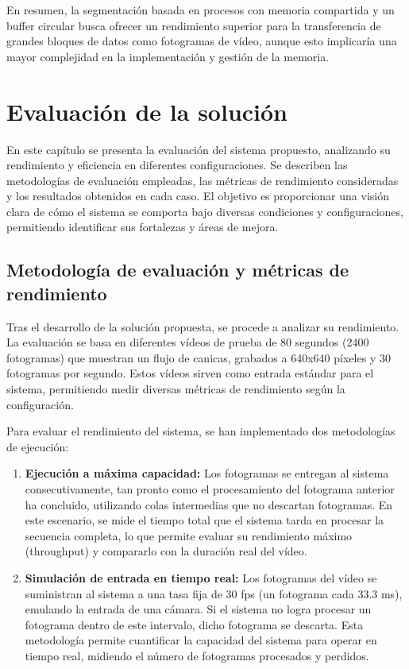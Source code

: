 \documentclass[11pt,spanish,listoffigures,listoftables]{tfgetsinf}
\begin{document}
En resumen, la segmentación basada en procesos con memoria compartida y un buffer circular busca ofrecer un rendimiento superior para la transferencia de grandes bloques de datos como fotogramas de vídeo, aunque esto implicaría una mayor complejidad en la implementación y gestión de la memoria.


\chapter{Evaluación de la solución} \label{chap:evaluacion_solucion}

En este capítulo se presenta la evaluación del sistema propuesto, analizando su rendimiento y eficiencia en diferentes configuraciones. Se describen las metodologías de evaluación empleadas, las métricas de rendimiento consideradas y los resultados obtenidos en cada caso. El objetivo es proporcionar una visión clara de cómo el sistema se comporta bajo diversas condiciones y configuraciones, permitiendo identificar sus fortalezas y áreas de mejora.

\section{Metodología de evaluación y métricas de rendimiento} \label{sec:metodologia}

Tras el desarrollo de la solución propuesta, se procede a analizar su rendimiento. La evaluación se basa en diferentes vídeos de prueba de 80 segundos (2400 fotogramas) que muestran un flujo de canicas, grabados a 640x640 píxeles y 30 fotogramas por segundo. Estos vídeos sirven como entrada estándar para el sistema, permitiendo medir diversas métricas de rendimiento según la configuración.

Para evaluar el rendimiento del sistema, se han implementado dos metodologías de ejecución:

\begin{enumerate}
   \item \textbf{Ejecución a máxima capacidad:} Los fotogramas se entregan al sistema consecutivamente, tan pronto como el procesamiento del fotograma anterior ha concluido, utilizando colas intermedias que no descartan fotogramas. En este escenario, se mide el tiempo total que el sistema tarda en procesar la secuencia completa, lo que permite evaluar su rendimiento máximo (throughput) y compararlo con la duración real del vídeo.
   \item \textbf{Simulación de entrada en tiempo real:} Los fotogramas del vídeo se suministran al sistema a una tasa fija de 30 fps (un fotograma cada 33.3 ms), emulando la entrada de una cámara. Si el sistema no logra procesar un fotograma dentro de este intervalo, dicho fotograma se descarta. Esta metodología permite cuantificar la capacidad del sistema para operar en tiempo real, midiendo el número de fotogramas procesados y perdidos.
\end{enumerate}
\end{document}
